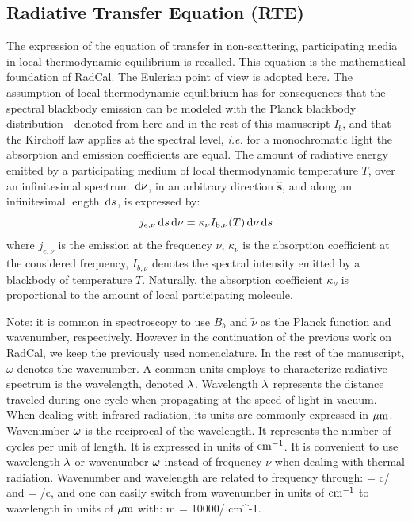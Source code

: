 \subsection{Radiative Transfer Equation (RTE)}
The expression of the equation of transfer in non-scattering, participating media in local thermodynamic equilibrium is recalled. This equation is the mathematical foundation of RadCal. The Eulerian point of view is adopted here. The assumption of local thermodynamic equilibrium has for consequences that the spectral blackbody emission can be modeled with the Planck blackbody distribution - denoted from here and in the rest of this manuscript $I_b$, and that the Kirchoff law applies at the spectral level, \textit{i.e.} for a monochromatic light the absorption and emission coefficients are equal. The amount of radiative energy emitted by a participating medium of local thermodynamic temperature $T$, over an infinitesimal spectrum $\,\mathrm{d}\nu$, in an arbitrary direction $\hat{\textbf{s}}$, and along an infinitesimal length $\,\mathrm{d} s$, is expressed by:
\begin{equation}\label{eq:emission}
 j_{e,\nu} \,\mathrm{d} s \,\mathrm{d}\nu = \kappa_{\nu} I_{\rm b,\nu}(T)\,\mathrm{d}\nu \,\mathrm{d} s
\end{equation}
where $j_{e,\nu}$ is the emission at the frequency $\nu$, $\kappa_{\nu}$ is the absorption coefficient at the considered frequency, $I_{b,\nu}$ denotes the spectral intensity emitted by a blackbody of temperature $T$. Naturally, the absorption coefficient $\kappa_{\nu}$ is proportional to the amount of local participating molecule.


Note: it is common in spectroscopy to use $B_b$ and $\tilde{\nu}$ as the Planck function and wavenumber, respectively. However in the continuation of the previous work on RadCal, we keep the previously used nomenclature. In the rest of the manuscript, $\omega$ denotes the wavenumber. A common units employs to characterize radiative spectrum is the wavelength, denoted $\lambda$. Wavelength $\lambda$ represents the distance traveled during one cycle when propagating at the speed of light in vacuum. When dealing with infrared radiation, its units are commonly expressed in ${\rm \mu m}$. Wavenumber $\omega$ is the reciprocal of the wavelength. It represents the number of cycles per unit of length. It is expressed in units of ${\rm cm^{-1}}$. It is convenient to use wavelength $\lambda$ or wavenumber $\omega$ instead of frequency $\nu$ when dealing with thermal radiation. Wavenumber and wavelength are related to frequency through:
\be
 \la = c/\nu \: \: \rm{and} \: \: \om = \nu /c,
\ee
 and one can easily switch from wavenumber in units of ${\rm cm^{-1}}$ to wavelength in units of ${\rm \mu m}$ with:
\be
  \la \; {\rm \mu m}  \; = 10000/\om \; \; {\rm cm^{-1}}.
\ee

